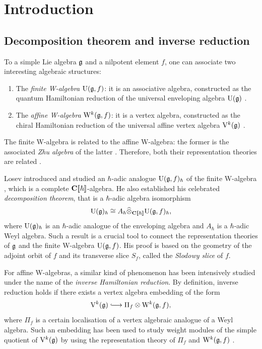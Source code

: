 \section{Introduction}

\subsection{Decomposition theorem and inverse reduction}

To a simple Lie algebra $\mathfrak g$ and a nilpotent element $f$, one can associate two interesting algebraic structures: 
\begin{enumerate}
	\item The \emph{finite W-algebra} $\mathrm U(\mathfrak g, f)$: it is an associative algebra, constructed as the quantum Hamiltonian reduction of the universal enveloping algebra $\mathrm U(\mathfrak g)$ \cite{kostant1978whittaker,premet2002special,gan2002quantization}.
	
	\item The \emph{affine W-algebra} $\mathrm W^k(\mathfrak g, f)$: it is a vertex algebra, constructed as the chiral Hamiltonian reduction of the universal affine vertex algebra $\mathrm V^k(\mathfrak g)$ \cite{feigin1990quantization,kac2003quantum,kac2004quantum}.
\end{enumerate}
The finite W-algebra is related to the affine W-algebra: the former is the associated \emph{Zhu algebra} of the latter \cite{desole2006finite}. Therefore, both their representation theories are related \cite{zhu1996modular}.

Losev introduced and studied an $\hbar$-adic analogue $\mathrm U(\mathfrak g, f)_\hbar$ of the finite W-algebra \cite{losev2010quantized}, which is a complete $\mathbf{C}[\![\hbar]\!]$-algebra. He also established his celebrated \emph{decomposition theorem}, that is a $\hbar$-adic algebra isomorphism
\begin{equation} \label{equation:decomposition-theorem}
	\mathrm U(\mathfrak g)_\hbar \cong A_\hbar \widehat\otimes_{\mathbf{C}[\![\hbar]\!]} \mathrm U(\mathfrak g, f)_\hbar, 
\end{equation}
where $\mathrm U(\mathfrak g)_\hbar$ is an $\hbar$-adic analogue of the enveloping algebra and $A_\hbar$ is a $\hbar$-adic Weyl algebra. Such a result is a crucial tool to connect the representation theories of $\mathfrak g$ and the finite W-algebra $\mathrm U(\mathfrak g, f)$. His proof is based on the geometry of the adjoint orbit of $f$ and its transverse slice $S_f$, called the \emph{Slodowy slice} of $f$.

For affine W-algebras, a similar kind of phenomenon has been intensively studied under the name of the \emph{inverse Hamiltonian reduction}. By definition, inverse reduction holds if there exists a vertex algebra embedding of the form
\begin{equation} \label{equation:inverse-reduction}
	\V^k(\g) \hooklongrightarrow  \Pi_f \otimes \W^k(\g, f), 
\end{equation}
where $\Pi_f$ is a certain localisation of a vertex algebraic analogue of a Weyl algebra. Such an embedding has been used to study weight modules of the simple quotient of $\mathrm V^k(\mathfrak g)$ by using the representation theory of $\Pi_f$ and $\mathrm W^k(\mathfrak g, f)$ \cite{adamovic2019realizations,adamovic2021realisation,adamovic2024relaxed,fasquel2025modularity}. 

